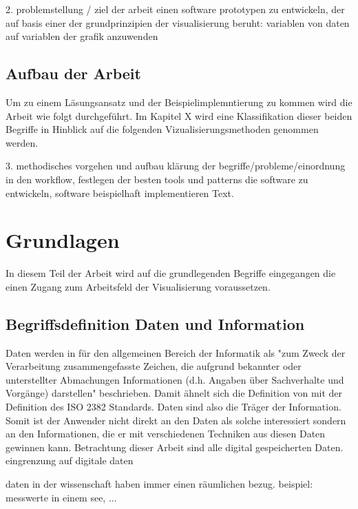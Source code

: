 \documentclass[a4paper, 12pt, onepage, pdftex, headsepline, footsepline]{scrreprt}
\begin{document}
2. problemstellung / ziel der arbeit
einen software prototypen zu entwickeln, der auf basis einer der grundprinzipien der visualisierung beruht: variablen von daten auf variablen der grafik anzuwenden

\section{Aufbau der Arbeit}
Um zu einem Läsungsansatz und der Beispielimplemntierung zu kommen wird die Arbeit wie folgt durchgeführt.
Im Kapitel X wird eine Klassifikation dieser beiden Begriffe in Hinblick auf die folgenden Vizualisierungsmethoden genommen werden.

3. methodisches vorgehen und aufbau
klärung der begriffe/probleme/einordnung in den workflow, festlegen der besten tools und patterns die software zu entwickeln, software beispielhaft implementieren Text.

\chapter{Grundlagen}
In diesem Teil der Arbeit wird auf die grundlegenden Begriffe eingegangen die einen Zugang
zum Arbeitsfeld der Visualisierung voraussetzen.
\section{Begriffsdefinition Daten und Information}
Daten werden in \cite{Gabler} für den allgemeinen Bereich der Informatik als "zum Zweck der Verarbeitung
zusammengefasste Zeichen, die aufgrund bekannter oder unterstellter Abmachungen Informationen
(d.h. Angaben über Sachverhalte und Vorgänge) darstellen" 
beschrieben.
Damit ähnelt sich die Definition von \cite{Gabler} mit der Definition des ISO 2382 Standards. 
Daten sind also die Träger der Information. Somit ist der Anwender nicht direkt an den Daten
als solche interessiert sondern an den Informationen, die er mit verschiedenen Techniken aus
diesen Daten gewinnen kann.
Betrachtung dieser Arbeit sind alle digital gespeicherten Daten.
eingrenzung auf digitale daten

daten in der wissenschaft haben immer einen räumlichen bezug. beispiel: messwerte in einem see, ...
\end{document}
